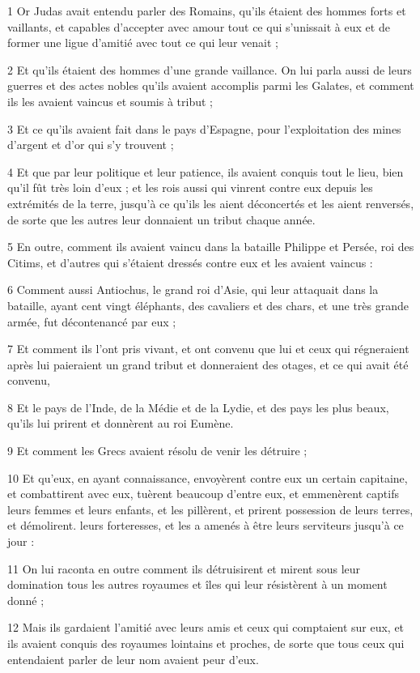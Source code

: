 \par 1 Or Judas avait entendu parler des Romains, qu'ils étaient des hommes forts et vaillants, et capables d'accepter avec amour tout ce qui s'unissait à eux et de former une ligue d'amitié avec tout ce qui leur venait ;
\par 2 Et qu'ils étaient des hommes d'une grande vaillance. On lui parla aussi de leurs guerres et des actes nobles qu'ils avaient accomplis parmi les Galates, et comment ils les avaient vaincus et soumis à tribut ;
\par 3 Et ce qu'ils avaient fait dans le pays d'Espagne, pour l'exploitation des mines d'argent et d'or qui s'y trouvent ;
\par 4 Et que par leur politique et leur patience, ils avaient conquis tout le lieu, bien qu'il fût très loin d'eux ; et les rois aussi qui vinrent contre eux depuis les extrémités de la terre, jusqu'à ce qu'ils les aient déconcertés et les aient renversés, de sorte que les autres leur donnaient un tribut chaque année.
\par 5 En outre, comment ils avaient vaincu dans la bataille Philippe et Persée, roi des Citims, et d'autres qui s'étaient dressés contre eux et les avaient vaincus :
\par 6 Comment aussi Antiochus, le grand roi d'Asie, qui leur attaquait dans la bataille, ayant cent vingt éléphants, des cavaliers et des chars, et une très grande armée, fut décontenancé par eux ;
\par 7 Et comment ils l'ont pris vivant, et ont convenu que lui et ceux qui régneraient après lui paieraient un grand tribut et donneraient des otages, et ce qui avait été convenu,
\par 8 Et le pays de l'Inde, de la Médie et de la Lydie, et des pays les plus beaux, qu'ils lui prirent et donnèrent au roi Eumène.
\par 9 Et comment les Grecs avaient résolu de venir les détruire ;
\par 10 Et qu'eux, en ayant connaissance, envoyèrent contre eux un certain capitaine, et combattirent avec eux, tuèrent beaucoup d'entre eux, et emmenèrent captifs leurs femmes et leurs enfants, et les pillèrent, et prirent possession de leurs terres, et démolirent. leurs forteresses, et les a amenés à être leurs serviteurs jusqu'à ce jour :
\par 11 On lui raconta en outre comment ils détruisirent et mirent sous leur domination tous les autres royaumes et îles qui leur résistèrent à un moment donné ;
\par 12 Mais ils gardaient l'amitié avec leurs amis et ceux qui comptaient sur eux, et ils avaient conquis des royaumes lointains et proches, de sorte que tous ceux qui entendaient parler de leur nom avaient peur d'eux.
